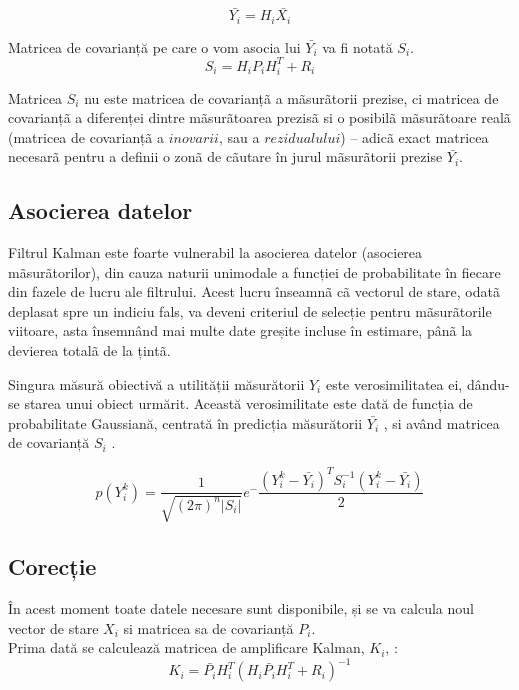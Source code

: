 \begin{equation}
\bar{Y_i}=H_i\bar{X_i}
\end{equation}

\-\hspace{1cm}Matricea de covarianță pe care o vom asocia lui $\bar{Y_i}$ va fi notată $S_i$.
\begin{equation}
S_i=H_iP_iH_i^T+R_i
\end{equation}

\-\hspace{1cm}Matricea $S_i$ nu este matricea de covarianțã a mãsurãtorii prezise, ci matricea de covarianțã a
diferenței dintre mãsurãtoarea prezisã si o posibilã mãsurãtoare realã (matricea de covarianțã
a $inovarii$, sau a $rezidualului$) – adicã exact matricea necesarã pentru a definii o zonã de
cãutare în jurul mãsurãtorii prezise  $\bar{Y_i}$.

\subsection{Asocierea datelor}
\-\hspace{1cm}Filtrul Kalman este foarte vulnerabil la asocierea datelor (asocierea mãsurãtorilor), din cauza naturii unimodale a funcției de probabilitate în fiecare din fazele de
lucru ale filtrului. Acest lucru înseamnã cã vectorul de stare, odatã deplasat spre un indiciu
fals, va deveni criteriul de selecție pentru mãsurãtorile viitoare, asta însemnând mai multe
date greșite incluse în estimare, pânã la devierea totalã de la țintã.

Singura măsură obiectivă a utilității măsurătorii $Y_i$ este verosimilitatea ei, dându-se starea
unui obiect urmărit. Această verosimilitate este dată de funcția de probabilitate Gaussiană,
centrată în predicția măsurătorii $\bar{Y_i}$ , si având matricea de covarianță $S_i$ \cite{kalman1}.

\begin{equation}
p(Y_i^k)=\frac{1}{ \sqrt{(2\pi)^n|S_i|}}e^-\frac{{(Y_i^k-\bar{Y_i})}^TS_i^{-1}(Y_i^k-\bar{Y_i})}{2}
\end{equation}

\subsection{Corecție}
\-\hspace{1cm}În acest moment toate datele necesare sunt disponibile, și se va calcula noul vector de stare
$X_i$ si matricea sa de covarianță $P_i$.\\
\-\hspace{1cm}Prima dată se calculează matricea de amplificare Kalman, $K_i$, \cite{kalman1}:
\begin{equation}
K_i=\bar{P_i}H_i^T{(H_i\bar{P_i}H_i^T+R_i)}^{-1}
\end{equation}

